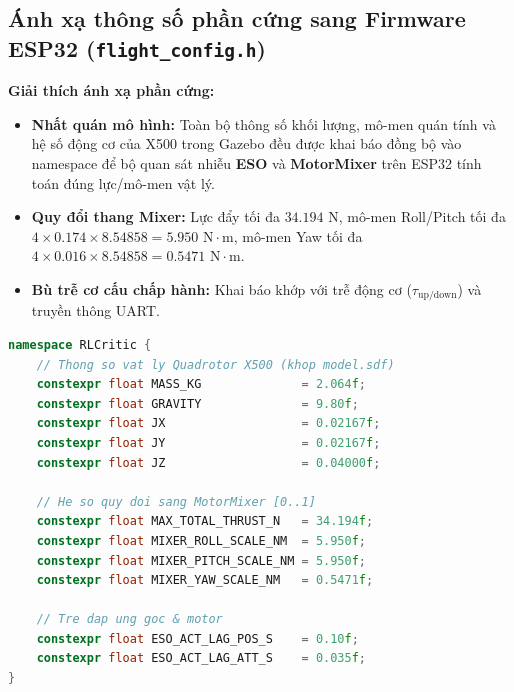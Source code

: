\documentclass[11pt,a4paper]{article}
\begin{document}
\subsection{Ánh xạ thông số phần cứng sang Firmware ESP32 (\texttt{flight\_config.h})}
\noindent
\begin{minipage}[t]{0.45\textwidth}
\vspace{0pt}
\textbf{Giải thích ánh xạ phần cứng:}
\begin{itemize}
    \item \textbf{Nhất quán mô hình:} Toàn bộ thông số khối lượng, mô-men quán tính và hệ số động cơ của X500 trong Gazebo đều được khai báo đồng bộ vào namespace  để bộ quan sát nhiễu \textbf{ESO} và \textbf{MotorMixer} trên ESP32 tính toán đúng lực/mô-men vật lý.
    \item \textbf{Quy đổi thang Mixer:} Lực đẩy tối đa $34.194\text{ N}$, mô-men Roll/Pitch tối đa $4 \times 0.174 \times 8.54858 = 5.950\text{ N}\cdot\text{m}$, mô-men Yaw tối đa $4 \times 0.016 \times 8.54858 = 0.5471\text{ N}\cdot\text{m}$.
    \item \textbf{Bù trễ cơ cấu chấp hành:} Khai báo  khớp với trễ động cơ ($\tau_{\text{up/down}}$) và truyền thông UART.
\end{itemize}
\end{minipage}
\hfill
\begin{minipage}[t]{0.52\textwidth}
\vspace{0pt}
\begin{lstlisting}[language=C++, firstnumber=150]
namespace RLCritic {
    // Thong so vat ly Quadrotor X500 (khop model.sdf)
    constexpr float MASS_KG              = 2.064f;
    constexpr float GRAVITY              = 9.80f;
    constexpr float JX                   = 0.02167f;
    constexpr float JY                   = 0.02167f;
    constexpr float JZ                   = 0.04000f;

    // He so quy doi sang MotorMixer [0..1]
    constexpr float MAX_TOTAL_THRUST_N   = 34.194f;
    constexpr float MIXER_ROLL_SCALE_NM  = 5.950f;
    constexpr float MIXER_PITCH_SCALE_NM = 5.950f;
    constexpr float MIXER_YAW_SCALE_NM   = 0.5471f;

    // Tre dap ung goc & motor
    constexpr float ESO_ACT_LAG_POS_S    = 0.10f;
    constexpr float ESO_ACT_LAG_ATT_S    = 0.035f;
}
\end{lstlisting}
\end{minipage}
\end{document}
